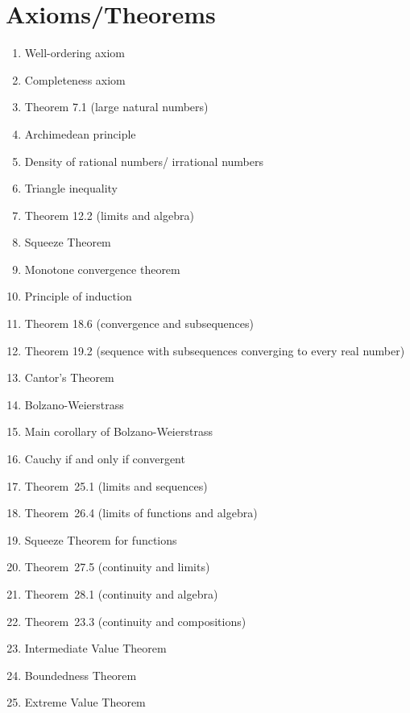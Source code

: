 \documentclass[12pt]{amsart}
\begin{document}
\section*{Axioms/Theorems}

\begin{enumerate}
	\item Well-ordering axiom
	\item Completeness axiom
	\item Theorem 7.1 (large natural numbers)
	\item Archimedean principle
	\item Density of rational numbers/ irrational numbers
	\item Triangle inequality
	\item Theorem 12.2 (limits and algebra)
	\item Squeeze Theorem
	\item Monotone convergence theorem
	\item Principle of induction
	\item Theorem 18.6 (convergence and subsequences)
	\item Theorem 19.2 (sequence with subsequences converging to every real number)
	\item Cantor's Theorem

	\item Bolzano-Weierstrass

	\item Main corollary of Bolzano-Weierstrass
	\item Cauchy if and only if convergent

	\item Theorem~25.1 (limits and sequences)
	\item Theorem~26.4 (limits of functions and algebra)
	\item Squeeze Theorem for functions

	\item Theorem~27.5 (continuity and limits)
	
	\item Theorem~28.1 (continuity and algebra)
	\item Theorem~23.3 (continuity and compositions)
		\item Intermediate Value Theorem
	\item Boundedness Theorem
	\item Extreme Value Theorem
		\begin{comment}

	\item Derivatives and algebra (Theorem 28.1)
	\item Chain rule (Theorem 28.4)
	\item Min-Max Theorem
	\item Mean Value Theorem
	\item Increasing/decreasing functions and derivatives (Corollary 30.5)
\end{comment}
\end{enumerate}
\end{document}
